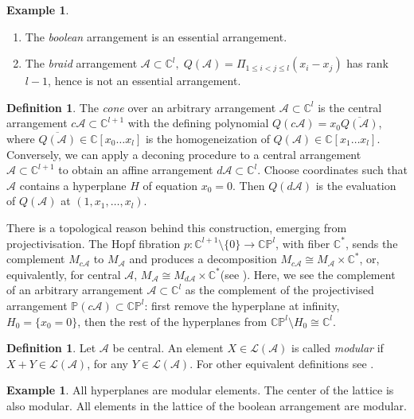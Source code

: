 \documentclass[psamsfonts]{conm-p-l}
\theoremstyle{definition}
\newtheorem{definition}[theorem]{Definition}
\newtheorem{example}[theorem]{Example}
\theoremstyle{remark}
\numberwithin{equation}{section}
\newcommand{\A}{{\mathcal A}}
\newcommand{\C}{\mathbb{C}}
\newcommand{\p}{\mathbb{P}}
\begin{document}
\begin{example}
\label{essential}
\begin{enumerate}
\item \label{boolean}
The {\em boolean} arrangement is an essential arrangement.
\item \label{converse}
The {\em braid} arrangement $\A \subset \C^l,\; Q(\A)=\Pi_{1 \leq i<j \leq l}(x_i-x_j)$ 
has rank $l-1$, 
hence is not an essential arrangement.
\end{enumerate}
\end{example}

\begin{definition}
\label{cone}
The {\em cone} over an arbitrary arrangement $\A \subset \C^l$ is the  
central arrangement $c\A \subset \C^{l+1}$ 
with the defining polynomial $Q(c\A)=x_0 \overline{Q(\A)}$, where $\overline{Q(\A)} \in \C[x_0 \dots x_l]$
is the homogeneization of $Q(\A) \in \C[x_1 \dots x_l]$.
Conversely, we can apply a deconing procedure to a central arrangement $\A \subset \C^{l+1}$ to obtain 
an affine arrangement $d\A \subset \C^l$. Choose coordinates such that $\A$ contains a hyperplane $H$
of equation $x_0=0$. Then $Q(d\A)$ is the evaluation of $Q(\A)$ at $(1, x_1, \dots, x_l)$.
\end{definition}

There is a topological reason behind this construction, emerging from projectivisation. 
The Hopf fibration $p: \C^{l+1} \setminus \{0\} \longrightarrow  \C \p^{l}$, with fiber $\C^*$, sends 
the complement $M_{c\A}$ to $M_{\A}$ and produces a decomposition $M_{c\A} \cong M_{\A} \times \C^*$,
or, equivalently,  for central $\A$, $M_{\A} \cong M_{d\A} \times \C^*$(see \cite[Proposition 5.1]{OT}). 
Here, we  see the complement of an arbitrary arrangement $\A \subset \C^l$ as the complement of 
the projectivised arrangement $\p (c\A) \subset \C\p^l$: first remove the hyperplane at infinity, 
$H_0= \{ x_0=0\}$, 
then the rest of the hyperplanes from $\C\p^l \setminus H_0 \cong \C^l$.

\begin{definition}
\label{modular}
Let $\A$ be central. An element $X \in \mathcal L(\A)$ is called {\em modular} if 
$X+Y \in \mathcal L(\A)$, for any $Y\in \mathcal L(\A)$.
For other equivalent definitions see \cite[\S2.1]{OT}.
\end{definition}


\begin{example}
\label{modular1}
All hyperplanes are modular elements. The center of the lattice is also modular. 
All elements in the lattice of the boolean arrangement are modular.
\end{example}
\end{document}

